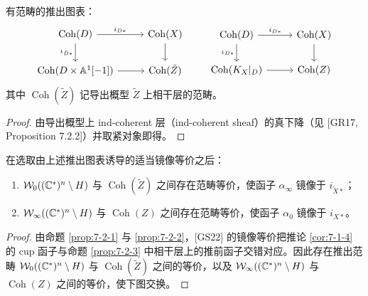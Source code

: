 
\begin{proposition}\label{prop:7-2-3}
有范畴的推出图表：
\[
\begin{tikzcd}[column sep=2.6em, row sep=1.8em]
\operatorname{Coh}(D) \arrow[r, "i_{D*}"] \arrow[d, "\iota_{\tilde D*}"'] & \operatorname{Coh}(X) \arrow[d] \\
\operatorname{Coh}(D\times\mathbb A^1[-1]) \arrow[r] & \operatorname{Coh}(\tilde Z)
\end{tikzcd}
\qquad
\begin{tikzcd}[column sep=2.6em, row sep=1.8em]
\operatorname{Coh}(D) \arrow[r, "i_{D*}"] \arrow[d, "\iota_{D*}"'] & \operatorname{Coh}(X) \arrow[d] \\
\operatorname{Coh}(K_X|_D) \arrow[r] & \operatorname{Coh}(Z)
\end{tikzcd}
\]
其中 $\operatorname{Coh}(\tilde Z)$ 记导出概型 $\tilde Z$ 上相干层的范畴。
\end{proposition}

\begin{proof}
由导出概型上 ind-coherent 层（ind-coherent sheaf）的真下降（见 [GR17, Proposition 7.2.2]）并取紧对象即得。
\end{proof}

\begin{theorem}\label{thm:7-2-4}
在选取由上述推出图表诱导的适当镜像等价之后：
\begin{enumerate}
\item $\mathcal{W}_0((\mathbb{C}^*)^n\setminus H)$ 与 $\operatorname{Coh}(\tilde Z)$ 之间存在范畴等价，使函子 $\alpha_\infty$ 镜像于 $i_{\tilde X*}$；
\item $\mathcal{W}_\infty((\mathbb{C}^*)^n\setminus H)$ 与 $\operatorname{Coh}(Z)$ 之间存在范畴等价，使函子 $\alpha_0$ 镜像于 $i_{X*}$。
\end{enumerate}
\end{theorem}

\begin{proof}
由命题 \ref{prop:7-2-1} 与 \ref{prop:7-2-2}，[GS22] 的镜像等价把推论 \ref{cor:7-1-4} 的 cup 函子与命题 \ref{prop:7-2-3} 中相干层上的推前函子交错对应。因此存在推出范畴 $\mathcal{W}_0((\mathbb{C}^*)^n\setminus H)$ 与 $\operatorname{Coh}(\tilde Z)$ 之间的等价，以及 $\mathcal{W}_\infty((\mathbb{C}^*)^n\setminus H)$ 与 $\operatorname{Coh}(Z)$ 之间的等价，使下图交换。
\end{proof}

